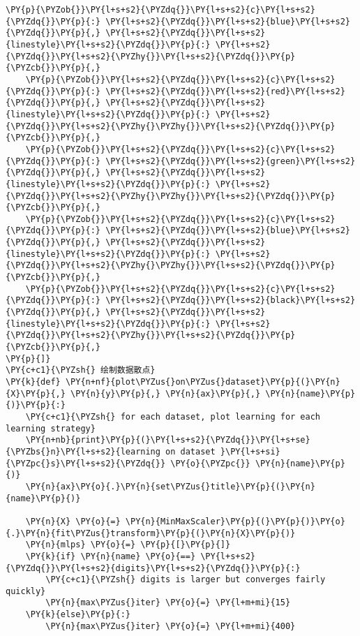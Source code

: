 \begin{Verbatim}[commandchars=\\\{\}]
    \PY{p}{\PYZob{}}\PY{l+s+s2}{\PYZdq{}}\PY{l+s+s2}{c}\PY{l+s+s2}{\PYZdq{}}\PY{p}{:} \PY{l+s+s2}{\PYZdq{}}\PY{l+s+s2}{blue}\PY{l+s+s2}{\PYZdq{}}\PY{p}{,} \PY{l+s+s2}{\PYZdq{}}\PY{l+s+s2}{linestyle}\PY{l+s+s2}{\PYZdq{}}\PY{p}{:} \PY{l+s+s2}{\PYZdq{}}\PY{l+s+s2}{\PYZhy{}}\PY{l+s+s2}{\PYZdq{}}\PY{p}{\PYZcb{}}\PY{p}{,}
    \PY{p}{\PYZob{}}\PY{l+s+s2}{\PYZdq{}}\PY{l+s+s2}{c}\PY{l+s+s2}{\PYZdq{}}\PY{p}{:} \PY{l+s+s2}{\PYZdq{}}\PY{l+s+s2}{red}\PY{l+s+s2}{\PYZdq{}}\PY{p}{,} \PY{l+s+s2}{\PYZdq{}}\PY{l+s+s2}{linestyle}\PY{l+s+s2}{\PYZdq{}}\PY{p}{:} \PY{l+s+s2}{\PYZdq{}}\PY{l+s+s2}{\PYZhy{}\PYZhy{}}\PY{l+s+s2}{\PYZdq{}}\PY{p}{\PYZcb{}}\PY{p}{,}
    \PY{p}{\PYZob{}}\PY{l+s+s2}{\PYZdq{}}\PY{l+s+s2}{c}\PY{l+s+s2}{\PYZdq{}}\PY{p}{:} \PY{l+s+s2}{\PYZdq{}}\PY{l+s+s2}{green}\PY{l+s+s2}{\PYZdq{}}\PY{p}{,} \PY{l+s+s2}{\PYZdq{}}\PY{l+s+s2}{linestyle}\PY{l+s+s2}{\PYZdq{}}\PY{p}{:} \PY{l+s+s2}{\PYZdq{}}\PY{l+s+s2}{\PYZhy{}\PYZhy{}}\PY{l+s+s2}{\PYZdq{}}\PY{p}{\PYZcb{}}\PY{p}{,}
    \PY{p}{\PYZob{}}\PY{l+s+s2}{\PYZdq{}}\PY{l+s+s2}{c}\PY{l+s+s2}{\PYZdq{}}\PY{p}{:} \PY{l+s+s2}{\PYZdq{}}\PY{l+s+s2}{blue}\PY{l+s+s2}{\PYZdq{}}\PY{p}{,} \PY{l+s+s2}{\PYZdq{}}\PY{l+s+s2}{linestyle}\PY{l+s+s2}{\PYZdq{}}\PY{p}{:} \PY{l+s+s2}{\PYZdq{}}\PY{l+s+s2}{\PYZhy{}\PYZhy{}}\PY{l+s+s2}{\PYZdq{}}\PY{p}{\PYZcb{}}\PY{p}{,}
    \PY{p}{\PYZob{}}\PY{l+s+s2}{\PYZdq{}}\PY{l+s+s2}{c}\PY{l+s+s2}{\PYZdq{}}\PY{p}{:} \PY{l+s+s2}{\PYZdq{}}\PY{l+s+s2}{black}\PY{l+s+s2}{\PYZdq{}}\PY{p}{,} \PY{l+s+s2}{\PYZdq{}}\PY{l+s+s2}{linestyle}\PY{l+s+s2}{\PYZdq{}}\PY{p}{:} \PY{l+s+s2}{\PYZdq{}}\PY{l+s+s2}{\PYZhy{}}\PY{l+s+s2}{\PYZdq{}}\PY{p}{\PYZcb{}}\PY{p}{,}
\PY{p}{]}
\PY{c+c1}{\PYZsh{} 绘制数据散点}
\PY{k}{def} \PY{n+nf}{plot\PYZus{}on\PYZus{}dataset}\PY{p}{(}\PY{n}{X}\PY{p}{,} \PY{n}{y}\PY{p}{,} \PY{n}{ax}\PY{p}{,} \PY{n}{name}\PY{p}{)}\PY{p}{:}
    \PY{c+c1}{\PYZsh{} for each dataset, plot learning for each learning strategy}
    \PY{n+nb}{print}\PY{p}{(}\PY{l+s+s2}{\PYZdq{}}\PY{l+s+se}{\PYZbs{}n}\PY{l+s+s2}{learning on dataset }\PY{l+s+si}{\PYZpc{}s}\PY{l+s+s2}{\PYZdq{}} \PY{o}{\PYZpc{}} \PY{n}{name}\PY{p}{)}
    \PY{n}{ax}\PY{o}{.}\PY{n}{set\PYZus{}title}\PY{p}{(}\PY{n}{name}\PY{p}{)}

    \PY{n}{X} \PY{o}{=} \PY{n}{MinMaxScaler}\PY{p}{(}\PY{p}{)}\PY{o}{.}\PY{n}{fit\PYZus{}transform}\PY{p}{(}\PY{n}{X}\PY{p}{)}
    \PY{n}{mlps} \PY{o}{=} \PY{p}{[}\PY{p}{]}
    \PY{k}{if} \PY{n}{name} \PY{o}{==} \PY{l+s+s2}{\PYZdq{}}\PY{l+s+s2}{digits}\PY{l+s+s2}{\PYZdq{}}\PY{p}{:}
        \PY{c+c1}{\PYZsh{} digits is larger but converges fairly quickly}
        \PY{n}{max\PYZus{}iter} \PY{o}{=} \PY{l+m+mi}{15}
    \PY{k}{else}\PY{p}{:}
        \PY{n}{max\PYZus{}iter} \PY{o}{=} \PY{l+m+mi}{400}


\end{Verbatim}
